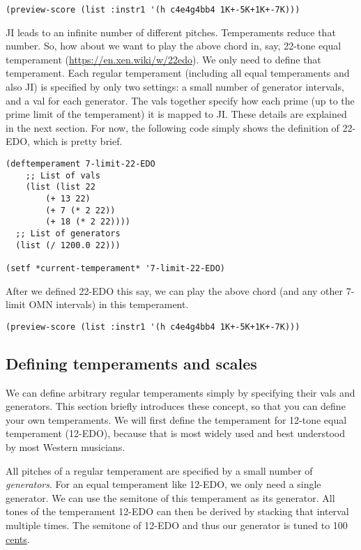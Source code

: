 \documentclass[11pt]{article}
\begin{document}
\begin{verbatim}
(preview-score (list :instr1 '(h c4e4g4bb4 1K+-5K+1K+-7K)))
\end{verbatim}


JI leads to an infinite number of different pitches. Temperaments reduce that number. So, how about
we want to play the above chord in, say, 22-tone equal temperament
(\url{https://en.xen.wiki/w/22edo}). We only need to define that temperament. Each regular
temperament (including all equal temperaments and also JI) is specified by only two settings: a small
number of generator intervals, and a val for each generator. The vals together specify how each
prime (up to the prime limit of the temperament) it is mapped to JI. These details are explained
in the next section. For now, the following code simply shows the definition of 22-EDO, which is pretty brief. 

\begin{verbatim}
(deftemperament 7-limit-22-EDO
    ;; List of vals
    (list (list 22
		(+ 13 22)
		(+ 7 (* 2 22))
		(+ 18 (* 2 22))))
  ;; List of generators
  (list (/ 1200.0 22)))

(setf *current-temperament* '7-limit-22-EDO)
\end{verbatim}

After we defined 22-EDO this say, we can play the above chord (and any other 7-limit OMN
intervals) in this temperament.


\begin{verbatim}
(preview-score (list :instr1 '(h c4e4g4bb4 1K+-5K+1K+-7K)))
\end{verbatim}



\subsection{Defining temperaments and scales}
\label{sec:orgfbecf1a}

We can define arbitrary regular temperaments simply by specifying their vals and generators. This
section briefly introduces these concept, so that you can define your own temperaments. We will
first define the temperament for 12-tone equal temperament (12-EDO), because that is most widely
used and best understood by most Western musicians. 

All pitches of a regular temperament are specified by a small number of \emph{generators}. For an
equal temperament like 12-EDO, we only need a single generator. We can use the semitone of this
temperament as its generator. All tones of the temperament 12-EDO can then be derived by
stacking that interval multiple times. The semitone of 12-EDO and thus our generator is tuned to
100 \href{https://en.wikipedia.org/wiki/Cent\_(music)}{cents}.
\end{document}

